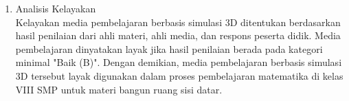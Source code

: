 \begin{enumerate}
\begin{enumerate}
\begin{table}[H]
\begin{tabular}{|c|p{3cm}|}
                \hline
            \end{tabular}
        \end{table}
        \textbf{Keterangan:}\\
        \( \begin{array}{lcl}
            M_i \text{ (Rata-rata ideal)} & = & \frac{1}{2} \times (\text{Skor Maksimal Ideal} + \text{Skor Minimal Ideal})\\
            SB_i \text{ (Simpangan baku ideal)} & = & \frac{1}{6} \times (\text{Skor Maksimal Ideal} - \text{Skor Minimal Ideal})\\
            \bar{x} & = & \text{Skor kevalidan}\\
            \text{Skor Maksimal Ideal} & = & \text{Jumlah Butir Kriteria} \times \text{Skor Tertinggi}\\
            \text{Skor Minimal Ideal} & = & \text{Jumlah Butir Kriteria} \times \text{Skor Terendah}
        \end{array} \)
        \item Analisis Kelayakan\\
        \hspace*{1cm}Kelayakan media pembelajaran berbasis simulasi 3D ditentukan berdasarkan hasil penilaian dari ahli materi, ahli media, dan respons peserta didik. Media pembelajaran dinyatakan layak jika hasil penilaian berada pada kategori minimal "Baik (B)". Dengan demikian, media pembelajaran berbasis simulasi 3D tersebut layak digunakan dalam proses pembelajaran matematika di kelas VIII SMP untuk materi bangun ruang sisi datar.
    \end{enumerate}
\end{enumerate}